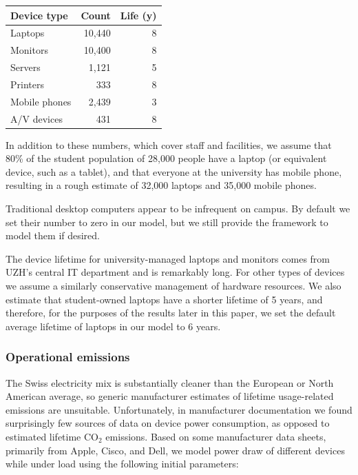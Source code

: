 \documentclass[11pt]{article}
\begin{document}
\begin{center}
  \begin{tabular}{|l|r|r|}
    \hline
    \textbf{Device type} & \textbf{Count} & \textbf{Life (y)}\\ \hline
    Laptops & 10,440 & 8 \\
    Monitors & 10,400 & 8 \\
    Servers & 1,121 & 5 \\
    Printers & 333 & 8 \\
    Mobile phones & 2,439 & 3 \\
    A/V devices & 431 & 8 \\ \hline
  \end{tabular}
  \label{tab:oncampusdevices}
\end{center}

In addition to these numbers, which cover staff and facilities, we assume that 80\% of the student population of 28,000 people have a laptop (or equivalent device, such as a tablet), and that everyone at the university has mobile phone, resulting in a rough estimate of 32,000 laptops and 35,000 mobile phones.

Traditional desktop computers appear to be infrequent on campus. By default we set their number to zero in our model, but we still provide the framework to model them if desired.

The device lifetime for university-managed laptops and monitors comes from UZH's central IT department and is remarkably long. For other types of devices we assume a similarly conservative management of hardware resources. We also estimate that student-owned laptops have a shorter lifetime of 5 years, and therefore, for the purposes of the results later in this paper, we set the default average lifetime of laptops in our model to 6 years.

\subsubsection*{Operational emissions}

The Swiss electricity mix is substantially cleaner than the European or North American average, so generic manufacturer estimates of lifetime usage-related emissions are unsuitable. Unfortunately, in manufacturer documentation we found surprisingly few sources of data on device power consumption, as opposed to estimated lifetime CO$_2$ emissions. Based on some manufacturer data sheets, primarily from Apple, Cisco, and Dell, we model power draw of different devices while under load using the following initial parameters:
\end{document}
